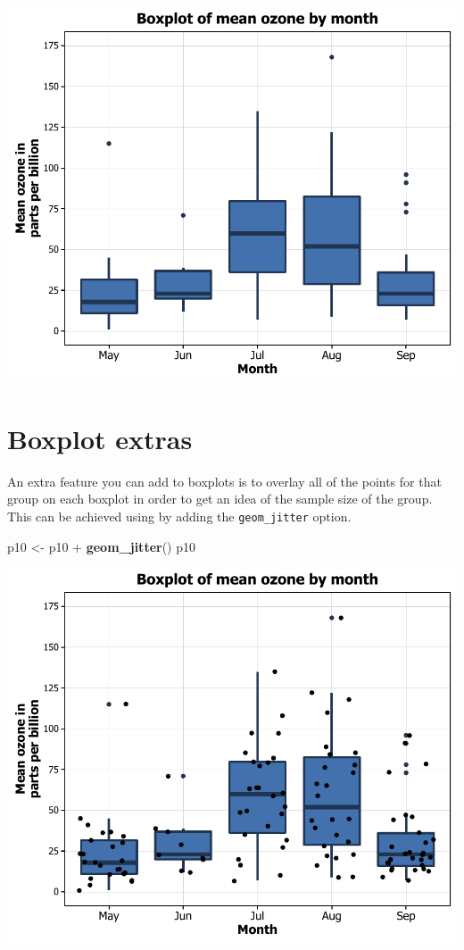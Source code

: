 \documentclass[]{article}
\newenvironment{Shaded}{\begin{snugshade}}{\end{snugshade}}
\newcommand{\KeywordTok}[1]{\textcolor[rgb]{0.13,0.29,0.53}{\textbf{{#1}}}}
\newcommand{\StringTok}[1]{\textcolor[rgb]{0.31,0.60,0.02}{{#1}}}
\newcommand{\NormalTok}[1]{{#1}}
\begin{document}
\begin{center}\includegraphics{10_Boxplots_pdf/box_14-1} \end{center}

\section{Boxplot extras}\label{boxplot-extras}

An extra feature you can add to boxplots is to overlay all of the points
for that group on each boxplot in order to get an idea of the sample
size of the group. This can be achieved using by adding the
\texttt{geom\_jitter} option.

\begin{Shaded}
\begin{Highlighting}[]
\NormalTok{p10 <-}\StringTok{ }\NormalTok{p10 +}\StringTok{ }\KeywordTok{geom_jitter}\NormalTok{()}
\NormalTok{p10}
\end{Highlighting}
\end{Shaded}

\begin{center}\includegraphics{10_Boxplots_pdf/box_15-1} \end{center}
\end{document}
